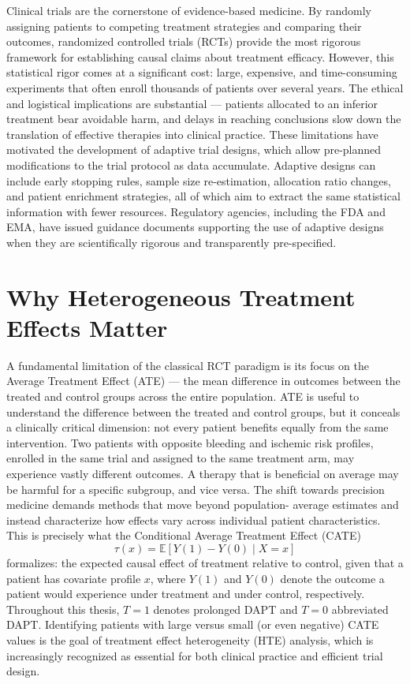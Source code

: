 Clinical trials are the cornerstone of evidence-based medicine. By randomly assigning
patients to competing treatment strategies and comparing their outcomes, randomized
controlled trials (RCTs) provide the most rigorous framework for establishing causal
claims about treatment efficacy. However, this statistical rigor comes at a significant
cost: large, expensive, and time-consuming experiments that often enroll thousands of
patients over several years. The ethical and logistical implications are substantial —
patients allocated to an inferior treatment bear avoidable harm, and delays in reaching
conclusions slow down the translation of effective therapies into clinical practice.
These limitations have motivated the development of adaptive trial designs, which
allow pre-planned modifications to the trial protocol as data accumulate. Adaptive
designs can include early stopping rules, sample size re-estimation, allocation ratio
changes, and patient enrichment strategies, all of which aim to extract the same
statistical information with fewer resources. Regulatory agencies, including the FDA
and EMA, have issued guidance documents supporting the use of adaptive designs when
they are scientifically rigorous and transparently pre-specified.

\section{Why Heterogeneous Treatment Effects Matter}

A fundamental limitation of the classical RCT paradigm is its focus on the Average
Treatment Effect (ATE) — the mean difference in outcomes between the treated and
control groups across the entire population. ATE is useful to understand the difference
between the treated and control groups, but it conceals a clinically critical dimension: not
every patient benefits equally from the same intervention. Two patients with opposite
bleeding and ischemic risk profiles, enrolled in the same trial and assigned to the same
treatment arm, may experience vastly different outcomes. A therapy that is beneficial
on average may be harmful for a specific subgroup, and vice versa.
The shift towards precision medicine demands methods that move beyond population-
average estimates and instead characterize how effects vary across individual patient
characteristics. This is precisely what the Conditional Average Treatment Effect (CATE)
\[
\tau(x) = \mathbb{E}\left[Y(1) - Y(0) \mid X = x\right]
\]
formalizes: the expected causal effect of treatment
relative to control, given that a patient has covariate profile $x$, where
$Y(1)$ and $Y(0)$ denote the outcome a patient would experience under
treatment and under control, respectively. Throughout this thesis, $T=1$
denotes prolonged DAPT and $T=0$ abbreviated DAPT. Identifying patients
with large versus small (or even negative) CATE values is the goal of treatment effect
heterogeneity (HTE) analysis, which is increasingly recognized as essential for both
clinical practice and efficient trial design.

